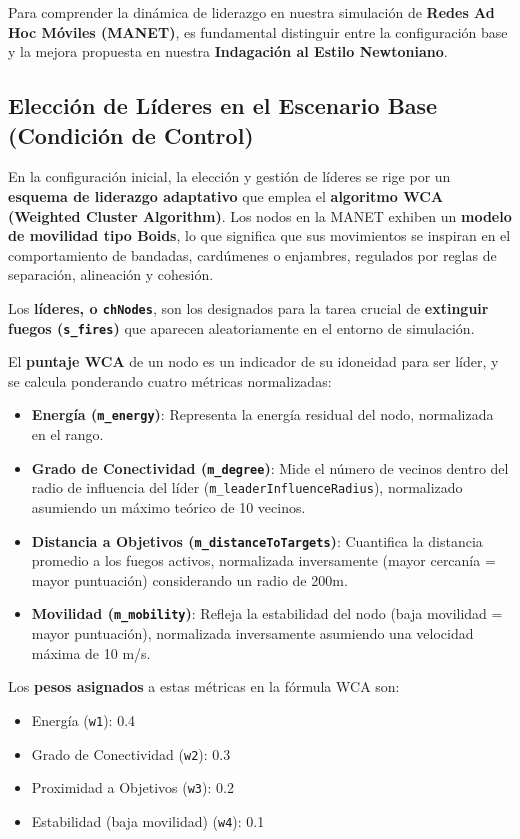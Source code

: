 \documentclass{article}
\begin{document}
Para comprender la dinámica de liderazgo en nuestra simulación de \textbf{Redes Ad Hoc Móviles (MANET)}, es fundamental distinguir entre la configuración base y la mejora propuesta en nuestra \textbf{Indagación al Estilo Newtoniano}.

\subsection*{Elección de Líderes en el Escenario Base (Condición de Control)}

En la configuración inicial, la elección y gestión de líderes se rige por un \textbf{esquema de liderazgo adaptativo} que emplea el \textbf{algoritmo WCA (Weighted Cluster Algorithm)}. Los nodos en la MANET exhiben un \textbf{modelo de movilidad tipo Boids}, lo que significa que sus movimientos se inspiran en el comportamiento de bandadas, cardúmenes o enjambres, regulados por reglas de separación, alineación y cohesión.

Los \textbf{líderes, o \texttt{chNodes}}, son los designados para la tarea crucial de \textbf{extinguir fuegos (\texttt{s\_fires})} que aparecen aleatoriamente en el entorno de simulación.

El \textbf{puntaje WCA} de un nodo es un indicador de su idoneidad para ser líder, y se calcula ponderando cuatro métricas normalizadas:

\begin{itemize}
  \item \textbf{Energía (\texttt{m\_energy})}: Representa la energía residual del nodo, normalizada en el rango.
  \item \textbf{Grado de Conectividad (\texttt{m\_degree})}: Mide el número de vecinos dentro del radio de influencia del líder (\texttt{m\_leaderInfluenceRadius}), normalizado asumiendo un máximo teórico de 10 vecinos.
  \item \textbf{Distancia a Objetivos (\texttt{m\_distanceToTargets})}: Cuantifica la distancia promedio a los fuegos activos, normalizada inversamente (mayor cercanía = mayor puntuación) considerando un radio de 200m.
  \item \textbf{Movilidad (\texttt{m\_mobility})}: Refleja la estabilidad del nodo (baja movilidad = mayor puntuación), normalizada inversamente asumiendo una velocidad máxima de 10 m/s.
\end{itemize}

Los \textbf{pesos asignados} a estas métricas en la fórmula WCA son:

\begin{itemize}
  \item Energía (\texttt{w1}): 0.4
  \item Grado de Conectividad (\texttt{w2}): 0.3
  \item Proximidad a Objetivos (\texttt{w3}): 0.2
  \item Estabilidad (baja movilidad) (\texttt{w4}): 0.1
\end{itemize}
\end{document}
